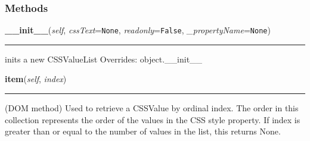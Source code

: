   \subsubsection{Methods}

    \vspace{0.5ex}

\hspace{.8\funcindent}\begin{boxedminipage}{\funcwidth}

    \raggedright \textbf{\_\_init\_\_}(\textit{self}, \textit{cssText}={\tt None}, \textit{readonly}={\tt False}, \textit{\_propertyName}={\tt None})

    \vspace{-1.5ex}

    \rule{\textwidth}{0.5\fboxrule}
\setlength{\parskip}{2ex}

inits a new CSSValueList
\setlength{\parskip}{1ex}
      Overrides: object.\_\_init\_\_

    \end{boxedminipage}

    \label{cssutils:css:cssvalue:CSSValueList:item}

    \vspace{0.5ex}

\hspace{.8\funcindent}\begin{boxedminipage}{\funcwidth}

    \raggedright \textbf{item}(\textit{self}, \textit{index})

    \vspace{-1.5ex}

    \rule{\textwidth}{0.5\fboxrule}
\setlength{\parskip}{2ex}

(DOM method) Used to retrieve a CSSValue by ordinal index. The
order in this collection represents the order of the values in the
CSS style property. If index is greater than or equal to the number
of values in the list, this returns None.
\setlength{\parskip}{1ex}
    \end{boxedminipage}

    \label{cssutils:css:cssvalue:CSSValueList:__iter__}


